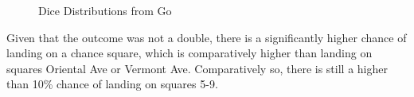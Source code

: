 \documentclass[12pt]{article}
\begin{document}
\begin{figure}[h]
  \centering
  \hfill
  \caption{Dice Distributions from Go}
\end{figure}

Given that the outcome was not a double, there is a significantly higher chance of landing on a chance square, which is comparatively higher than landing on squares Oriental Ave or Vermont Ave. Comparatively so, there is still a higher than 10\% chance of landing on squares 5-9.
\end{document}

